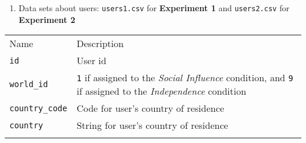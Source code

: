 \documentclass[]{article}
\begin{document}
\begin{enumerate}
\def\labelenumi{\arabic{enumi}.}
\setcounter{enumi}{1}
\itemsep1pt\parskip0pt
\item
  Data sets about users: \texttt{users1.csv} for \textbf{Experiment 1}
  and \texttt{users2.csv} for \textbf{Experiment 2}
\end{enumerate}

\begin{longtable}[c]{@{}ll@{}}
\toprule\addlinespace
\begin{minipage}[b]{0.18\columnwidth}\raggedright
Name
\end{minipage} & \begin{minipage}[b]{0.76\columnwidth}\raggedright
Description
\end{minipage}
\\\addlinespace
\midrule\endhead
\begin{minipage}[t]{0.18\columnwidth}\raggedright
\texttt{id}
\end{minipage} & \begin{minipage}[t]{0.76\columnwidth}\raggedright
User id
\end{minipage}
\\\addlinespace
\begin{minipage}[t]{0.18\columnwidth}\raggedright
\texttt{world\_id}
\end{minipage} & \begin{minipage}[t]{0.76\columnwidth}\raggedright
\texttt{1} if assigned to the \emph{Social Influence} condition, and
\texttt{9} if assigned to the \emph{Independence} condition
\end{minipage}
\\\addlinespace
\begin{minipage}[t]{0.18\columnwidth}\raggedright
\texttt{country\_code}
\end{minipage} & \begin{minipage}[t]{0.76\columnwidth}\raggedright
Code for user's country of residence
\end{minipage}
\\\addlinespace
\begin{minipage}[t]{0.18\columnwidth}\raggedright
\texttt{country}
\end{minipage} & \begin{minipage}[t]{0.76\columnwidth}\raggedright
String for user's country of residence
\end{minipage}
\\\addlinespace
\begin{minipage}[t]{0.18\columnwidth}\raggedright

\end{minipage}
\end{longtable}
\end{document}
